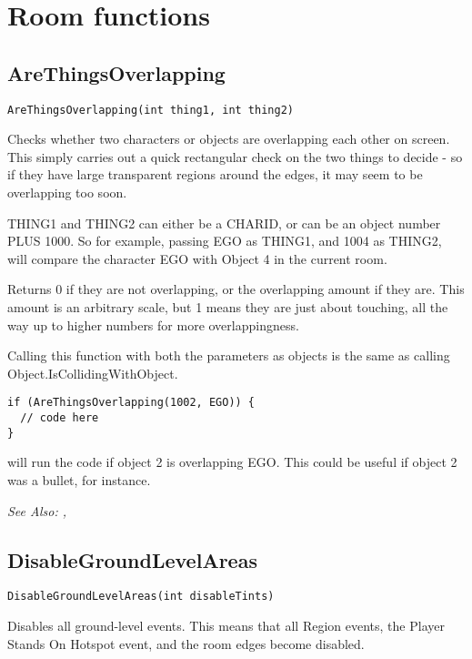 \section{Room functions}%


\subsection{AreThingsOverlapping}\label{AreThingsOverlapping}%

\begin{verbatim}
AreThingsOverlapping(int thing1, int thing2)
\end{verbatim}
Checks whether two characters or objects are overlapping each other on screen. This simply
carries out a quick rectangular check on the two things to decide - so if they have large
transparent regions around the edges, it may seem to be overlapping too soon.

THING1 and THING2 can either be a CHARID, or can be an object number PLUS 1000.
So for example, passing EGO as THING1, and 1004 as THING2, will compare the character EGO
with Object 4 in the current room.

Returns 0 if they are not overlapping, or the overlapping amount if they are. This amount
is an arbitrary scale, but 1 means they are just about touching, all the way up to higher numbers
for more overlappingness.

Calling this function with both the parameters as objects is the same as calling Object.IsCollidingWithObject.

\begin{verbatim}
if (AreThingsOverlapping(1002, EGO)) {
  // code here
}
\end{verbatim}
will run the code if object 2 is overlapping EGO. This could be useful if object 2 was a bullet,
for instance.

\it{See Also:} ,



\subsection{DisableGroundLevelAreas}\label{DisableGroundLevelAreas}%

\begin{verbatim}
DisableGroundLevelAreas(int disableTints)
\end{verbatim}
Disables all ground-level events. This means that all Region events, the Player Stands
On Hotspot event, and the room edges become disabled.


